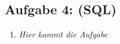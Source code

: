 \subsection{Aufgabe 4: (SQL)}
\label{sec:Aufgabe4}
\begin{enumerate}[label=\alph*)]
    \item \textit{Hier kommt die Aufgabe}
\end{enumerate}